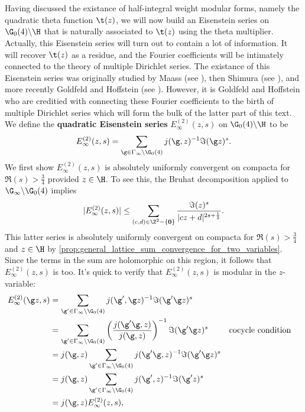     \section{}
      Having discussed the existance of half-integral weight modular forms, namely the quadratic theta function $\t(z)$, we will now build an Eisenstein series on $\G_{0}(4)\backslash\H$ that is naturally associated to $\t(z)$ using the theta multiplier. Actually, this Eisenstein series will turn out to contain a lot of information. It will recover $\t(z)$ as a residue, and the Fourier coefficients will be intimately connected to the theory of multiple Dirichlet series. The existance of this Eisenstein series was originally studied by Maass (see \cite{maass1937konstruktion}), then Shimura (see \cite{shimura1973modular,shimura1975holomorphy}), and more recently Goldfeld and Hoffstein (see \cite{hoffstein1985eisenstein}). However, it is Goldfeld and Hoffstein who are creditied with connecting these Fourier coefficients to the birth of multiple Dirichlet series which will form the bulk of the latter part of this text. We define the \textbf{quadratic Eisenstein series} $E_{\infty}^{(2)}(z,s)$ on $\G_{0}(4)\backslash\H$ to be
      \[
        E_{\infty}^{(2)}(z,s) = \sum_{\g \in \Gamma_{\infty}\backslash\G_{0}(4)}j(\g,z)^{-1}\Im(\g z)^{s}.
      \]
      We first show $E_{\infty}^{(2)}(z,s)$ is absolutely uniformly convergent on compacta for $\Re(s) > \frac{3}{4}$ provided $z \in \H$. To see this, the Bruhat decomposition applied to $\G_{\infty}\backslash\G_{0}(4)$ implies
      \[
        |E_{\infty}^{(2)}(z,s)| \le \sum_{(c,d) \in \Z^{2}-\{\mathbf{0}\}}\frac{\Im(z)^{s}}{|cz+d|^{2s+\frac{1}{2}}}.
      \]
      This latter series is absolutely uniformly convergent on compacta for $\Re(s) > \frac{3}{4}$ and $z \in \H$ by \cref{prop:general_lattice_sum_convergence_for_two_variables}. Since the terms in the sum are holomorphic on this region, it follows that $E_{\infty}^{(2)}(z,s)$ is too. It's quick to verify that $E_{\infty}^{(2)}(z,s)$ is modular in the $z$-variable:
      \begin{align*}
        E_{\infty}^{(2)}(\g z,s) &= \sum_{\g' \in \Gamma_{\infty}\backslash\G_{0}(4)}j(\g',\g z)^{-1}\Im(\g'\g z)^{s} \\
        &= \sum_{\g' \in \Gamma_{\infty}\backslash\G_{0}(4)}\left(\frac{j(\g'\g,z)}{j(\g,z)}\right)^{-1}\Im(\g'\g z)^{s} && \text{cocycle condition} \\
        &= j(\g,z)\sum_{\g' \in \Gamma_{\infty}\backslash\G_{0}(4)}j(\g'\g,z)^{-1}\Im(\g'\g z)^{s} \\
        &= j(\g,z)\sum_{\g' \in \Gamma_{\infty}\backslash\G_{0}(4)}j(\g',z)^{-1}\Im(\g'z)^{s} \\
        &= j(\g,z)E_{\infty}^{(2)}(z,s),
      \end{align*}
